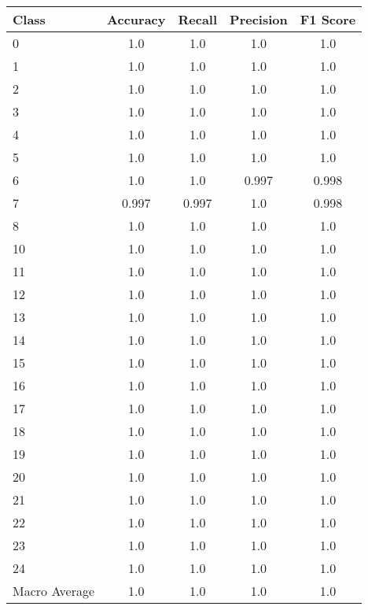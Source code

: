 \begin{tabular}{l c c c c}
Class & Accuracy & Recall & Precision & F1 Score\\ \hline
0 & 1.0 & 1.0 & 1.0 & 1.0\\
1 & 1.0 & 1.0 & 1.0 & 1.0\\
2 & 1.0 & 1.0 & 1.0 & 1.0\\
3 & 1.0 & 1.0 & 1.0 & 1.0\\
4 & 1.0 & 1.0 & 1.0 & 1.0\\
5 & 1.0 & 1.0 & 1.0 & 1.0\\
6 & 1.0 & 1.0 & 0.997 & 0.998\\
7 & 0.997 & 0.997 & 1.0 & 0.998\\
8 & 1.0 & 1.0 & 1.0 & 1.0\\
10 & 1.0 & 1.0 & 1.0 & 1.0\\
11 & 1.0 & 1.0 & 1.0 & 1.0\\
12 & 1.0 & 1.0 & 1.0 & 1.0\\
13 & 1.0 & 1.0 & 1.0 & 1.0\\
14 & 1.0 & 1.0 & 1.0 & 1.0\\
15 & 1.0 & 1.0 & 1.0 & 1.0\\
16 & 1.0 & 1.0 & 1.0 & 1.0\\
17 & 1.0 & 1.0 & 1.0 & 1.0\\
18 & 1.0 & 1.0 & 1.0 & 1.0\\
19 & 1.0 & 1.0 & 1.0 & 1.0\\
20 & 1.0 & 1.0 & 1.0 & 1.0\\
21 & 1.0 & 1.0 & 1.0 & 1.0\\
22 & 1.0 & 1.0 & 1.0 & 1.0\\
23 & 1.0 & 1.0 & 1.0 & 1.0\\
24 & 1.0 & 1.0 & 1.0 & 1.0\\
\hline
Macro Average & 1.0 & 1.0 & 1.0 & 1.0\\
\end{tabular}
